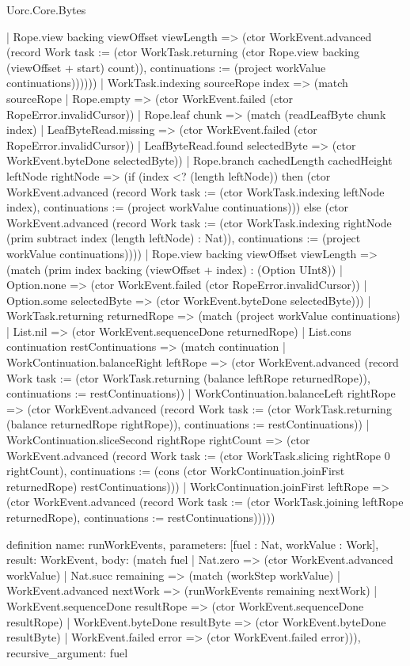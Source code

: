 \begin{lexlean}{Uorc.Core.Bytes}
\begin{semanticmodule}
{      | Rope.view backing viewOffset viewLength => (ctor WorkEvent.advanced (record Work {task := (ctor WorkTask.returning (ctor Rope.view backing (viewOffset + start) count)), continuations := (project workValue continuations)})))))
    | WorkTask.indexing sourceRope index => (match sourceRope
      | Rope.empty => (ctor WorkEvent.failed (ctor RopeError.invalidCursor))
      | Rope.leaf chunk => (match (readLeafByte chunk index)
        | LeafByteRead.missing => (ctor WorkEvent.failed (ctor RopeError.invalidCursor))
        | LeafByteRead.found selectedByte => (ctor WorkEvent.byteDone selectedByte))
      | Rope.branch cachedLength cachedHeight leftNode rightNode => (if (index <? (length leftNode)) then (ctor WorkEvent.advanced (record Work {task := (ctor WorkTask.indexing leftNode index), continuations := (project workValue continuations)})) else (ctor WorkEvent.advanced (record Work {task := (ctor WorkTask.indexing rightNode (prim subtract index (length leftNode) : Nat)), continuations := (project workValue continuations)})))
      | Rope.view backing viewOffset viewLength => (match (prim index backing (viewOffset + index) : (Option UInt8))
        | Option.none => (ctor WorkEvent.failed (ctor RopeError.invalidCursor))
        | Option.some selectedByte => (ctor WorkEvent.byteDone selectedByte)))
    | WorkTask.returning returnedRope => (match (project workValue continuations)
      | List.nil => (ctor WorkEvent.sequenceDone returnedRope)
      | List.cons continuation restContinuations => (match continuation
        | WorkContinuation.balanceRight leftRope => (ctor WorkEvent.advanced (record Work {task := (ctor WorkTask.returning (balance leftRope returnedRope)), continuations := restContinuations}))
        | WorkContinuation.balanceLeft rightRope => (ctor WorkEvent.advanced (record Work {task := (ctor WorkTask.returning (balance returnedRope rightRope)), continuations := restContinuations}))
        | WorkContinuation.sliceSecond rightRope rightCount => (ctor WorkEvent.advanced (record Work {task := (ctor WorkTask.slicing rightRope 0 rightCount), continuations := (cons (ctor WorkContinuation.joinFirst returnedRope) restContinuations)}))
        | WorkContinuation.joinFirst leftRope => (ctor WorkEvent.advanced (record Work {task := (ctor WorkTask.joining leftRope returnedRope), continuations := restContinuations})))))
}

definition{
  name: runWorkEvents,
  parameters: [fuel : Nat, workValue : Work],
  result: WorkEvent,
  body: (match fuel
    | Nat.zero => (ctor WorkEvent.advanced workValue)
    | Nat.succ remaining => (match (workStep workValue)
      | WorkEvent.advanced nextWork => (runWorkEvents remaining nextWork)
      | WorkEvent.sequenceDone resultRope => (ctor WorkEvent.sequenceDone resultRope)
      | WorkEvent.byteDone resultByte => (ctor WorkEvent.byteDone resultByte)
      | WorkEvent.failed error => (ctor WorkEvent.failed error))),
  recursive_argument: fuel
}


\end{semanticmodule}
\end{lexlean}

